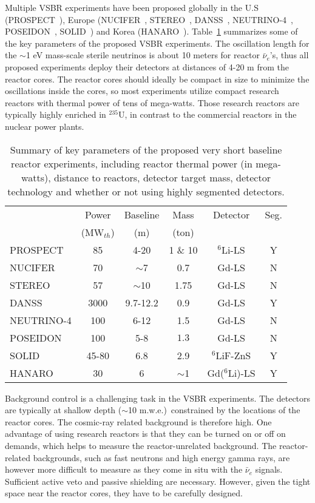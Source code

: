 Multiple VSBR experiments have been proposed globally in the U.S (PROSPECT~\cite{PROSPECT}), Europe (NUCIFER~\cite{NUCIFER-2010, NUCIFER-2014}, STEREO~\cite{NUCIFER-2014}, DANSS~\cite{DANSS}, NEUTRINO-4~\cite{NEUTRINO4-2012,NEUTRINO4-2014}, POSEIDON~\cite{POSEIDON}, SOLID~\cite{SoLid}) and Korea (HANARO~\cite{HANARO}). 
Table~\ref{tab:sterile} summarizes some of the key parameters of the proposed VSBR experiments. 
The oscillation length for the $\sim$1 eV mass-scale sterile neutrinos is about 10 meters for reactor $\bar\nu_e$'s, thus all proposed experiments deploy their detectors at distances of 4-20 m from the reactor cores. 
The reactor cores should ideally be compact in size to minimize the oscillations inside the cores, so most experiments utilize compact research reactors with thermal power of tens of mega-watts. Those research reactors are typically highly enriched in $^{235}$U, in contrast to the commercial reactors in the nuclear power plants. 

\begin{table}[tb]
  \begin{tabular}{lccccc}
  \hline
  & Power & Baseline & Mass & Detector & Seg. \\
  & (MW$_{th}$) & (m) & (ton) &    & \\
  \hline
  PROSPECT  & 85  & 4-20 & 1 \& 10  & $^6$Li-LS & Y \\
  NUCIFER   & 70 & $\sim$7  & 0.7 & Gd-LS & N \\
  STEREO & 57  & $\sim$10 & 1.75  & Gd-LS & N \\
  DANSS & 3000  & 9.7-12.2  & 0.9  & Gd-LS & Y \\
  NEUTRINO-4 & 100  & 6-12  & 1.5  & Gd-LS & N \\
  POSEIDON & 100  & 5-8  & $1.3$ & Gd-LS & N \\
  SOLID & 45-80 & 6.8  & 2.9  & $^6$LiF-ZnS & Y \\
  HANARO & 30  & 6  & $\sim$1  & Gd($^6$Li)-LS & Y \\
  \hline
  \end{tabular}
  \caption{Summary of key parameters of the proposed very short baseline reactor experiments, including reactor thermal power (in mega-watts), distance to reactors, detector target mass, detector technology and whether or not using highly segmented detectors.}
\label{tab:sterile}
\end{table}

Background control is a challenging task in the VSBR experiments. 
The detectors are typically at shallow depth ($\sim$10 m.w.e.)\ constrained by the locations of the reactor cores. 
The cosmic-ray related background is therefore high. 
One advantage of using research reactors is that they can be turned on or off on demands, which helps to measure the reactor-unrelated background. 
The reactor-related backgrounds, such as fast neutrons and high energy gamma rays, are however more difficult to measure as they come in situ with the $\bar\nu_e$ signals. Sufficient active veto and passive shielding are necessary. However, given the tight space near the reactor cores,  they have to be carefully designed.

